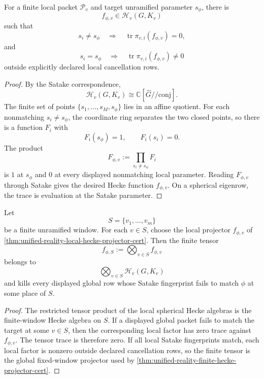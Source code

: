 \begin{theorem}
\label{thm:unified-reality-local-hecke-projector-cert}
For a finite local packet $\mathcal P_v$ and target unramified parameter
$s_{\phi}$, there is
$$
f_{\phi,v}\in\mathcal H_v(G,K_v)
$$
such that
$$
s_i\ne s_{\phi}
\quad\Longrightarrow\quad
\operatorname{tr}\pi_{v,i}(f_{\phi,v})=0,
$$
and
$$
s_i=s_{\phi}
\quad\Longrightarrow\quad
\operatorname{tr}\pi_{v,i}(f_{\phi,v})\ne0
$$
outside explicitly declared local cancellation rows.
\end{theorem}
\begin{proof}
By the Satake correspondence,
$$
\mathcal H_v(G,K_v)
\cong
\mathbb C[\widehat G/\!/\mathrm{conj}].
$$
The finite set of points $\{s_1,\ldots,s_M,s_{\phi}\}$ lies in an
affine quotient. For each nonmatching $s_i\ne s_{\phi}$, the coordinate
ring separates the two closed points, so there is a function $F_i$ with
$$
F_i(s_{\phi})=1,
\qquad
F_i(s_i)=0.
$$
The product
$$
F_{\phi,v}:=\prod_{s_i\ne s_{\phi}}F_i
$$
is $1$ at $s_{\phi}$ and $0$ at every displayed nonmatching local
parameter. Reading $F_{\phi,v}$ through Satake gives the desired Hecke
function $f_{\phi,v}$. On a spherical eigenrow, the trace is evaluation
at the Satake parameter.
\end{proof}

\begin{theorem}
\label{thm:unified-reality-global-detector-product-local}
Let
$$
S=\{v_1,\ldots,v_m\}
$$
be a finite unramified window. For each $v\in S$, choose the local
projector $f_{\phi,v}$ of
\autoref{thm:unified-reality-local-hecke-projector-cert}. Then the
finite tensor
$$
f_{\phi,S}:=\bigotimes_{v\in S}f_{\phi,v}
$$
belongs to
$$
\bigotimes_{v\in S}\mathcal H_v(G,K_v)
$$
and kills every displayed global row whose Satake fingerprint fails to
match $\phi$ at some place of $S$.
\end{theorem}
\begin{proof}
The restricted tensor product of the local spherical Hecke algebras is
the finite-window Hecke algebra on $S$. If a displayed global packet
fails to match the target at some $v\in S$, then the corresponding local
factor has zero trace against $f_{\phi,v}$. The tensor trace is therefore
zero. If all local Satake fingerprints match, each local factor is
nonzero outside declared cancellation rows, so the finite tensor is the
global fixed-window projector used by
\autoref{thm:unified-reality-finite-hecke-projector-cert}.
\end{proof}

